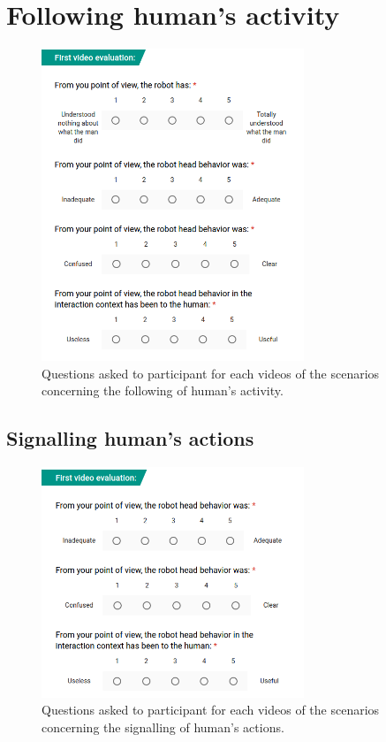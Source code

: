 \section{Following human's activity}


\begin{figure}[!h]
	\centering
    \includegraphics[width=0.7\textwidth]{figs/Chapter6/QuestionsSce2.png}
    \caption{Questions asked to participant for each videos of the scenarios concerning the following of human's activity.}
    \label{fig:headArchi}
\end{figure}

\subsection{Signalling human's actions}

\begin{figure}[!h]
	\centering
    \includegraphics[width=0.7\textwidth]{figs/Chapter6/QuestionsSce4.png}
    \caption{Questions asked to participant for each videos of the scenarios concerning the signalling of human's actions.}
    \label{fig:headArchi}
\end{figure}


